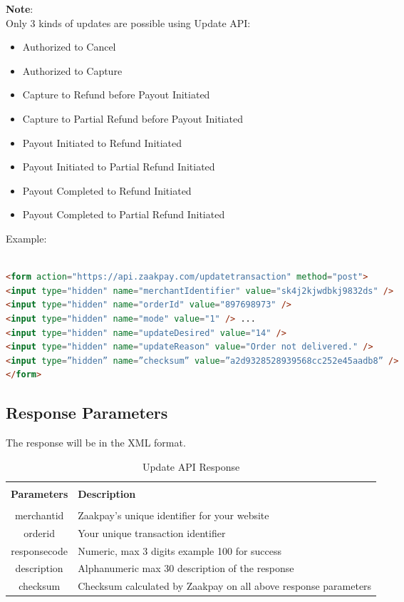 \documentclass{article}
\begin{document}
{\bfseries Note}: \\
Only 3 kinds of updates are possible using Update API:\\
\begin{itemize}
\item Authorized to Cancel
\item Authorized to Capture
\item Capture to Refund before Payout Initiated
\item Capture to Partial Refund before Payout Initiated
\item Payout Initiated to Refund Initiated
\item Payout Initiated to Partial Refund Initiated
\item Payout Completed to Refund Initiated
\item Payout Completed to Partial Refund Initiated
\end{itemize}
Example: \\

\begin{lstlisting}[language=html,breaklines=true]

<form action="https://api.zaakpay.com/updatetransaction" method="post">
<input type="hidden" name="merchantIdentifier" value="sk4j2kjwdbkj9832ds" />
<input type="hidden" name="orderId" value="897698973" />
<input type="hidden" name="mode" value="1" /> ...
<input type="hidden" name="updateDesired" value="14" />
<input type="hidden" name="updateReason" value="Order not delivered." />
<input type=”hidden” name=”checksum” value=”a2d9328528939568cc252e45aadb8” />
</form>
\end{lstlisting}
\subsection{Response Parameters}
The response will be in the XML format.

\begin{longtable}{||c|| p{12.5cm}||}
\rowcolor{white}
       \caption{Update API Response}\\
   \rowcolor{green!50}
\bfseries{Parameters} & \bfseries{Description} \\ \hline
 & \\
merchantid & Zaakpay's unique identifier for your website \\
orderid & Your unique transaction identifier\\
responsecode & Numeric, max 3 digits example 100 for success \\
description &Alphanumeric max 30 description of the response \\
checksum &Checksum calculated by Zaakpay on all above response parameters \\


\end{longtable}
\end{document}
